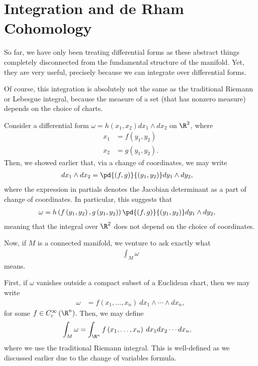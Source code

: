 \documentclass[10pt]{mypackage}
\begin{document}
\section{Integration and de Rham Cohomology}%
So far, we have only been treating differential forms as these abstract things completely disconnected from the fundamental structure of the manifold. Yet, they are very useful, precisely because we can integrate over differential forms.\newline

Of course, this integration is absolutely not the same as the traditional Riemann or Lebesgue integral, because the measure of a set (that has nonzero measure) depends on the choice of charts.\newline

Consider a differential form $\omega = h\left( x_1,x_2 \right)dx_1\wedge dx_2$ on $\R^{2}$, where
\begin{align*}
  x_1 &= f\left( y_1,y_2 \right)\\
  x_2 &= g\left( y_1,y_2 \right).
\end{align*}
Then, we showed earlier that, via a change of coordinates, we may write
\begin{align*}
  dx_1\wedge dx_2 &= \pd{\left( f,g \right)}{\left( y_1,y_2 \right)} dy_1\wedge dy_2,
\end{align*}
where the expression in partials denotes the Jacobian determinant as a part of change of coordinates. In particular, this suggests that
\begin{align*}
  \omega &= h\left( f\left( y_1,y_2 \right),g\left( y_1,y_2 \right) \right) \pd{\left( f,g \right)}{\left( y_1,y_2 \right)} dy_1\wedge dy_2,
\end{align*}
meaning that the integral over $\R^{2}$ does not depend on the choice of coordinates.\newline

Now, if $M$ is a connected manifold, we venture to ask exactly what
\begin{align*}
  \int_{M}^{} \omega
\end{align*}
means.\newline

First, if $\omega$ vanishes outside a compact subset of a Euclidean chart, then we may write
\begin{align*}
  \omega &= f\left( x_1,\dots,x_n \right)\:dx_1\wedge\cdots\wedge dx_n,
\end{align*}
for some $f\in C_{c}^{\infty}\left( \R^{n} \right)$. Then, we may define
\begin{align*}
  \int_{M}^{}\omega &= \int_{\R^{n}}^{} f\left( x_1,\dots,x_n \right)\:dx_1 dx_2\cdots dx_n,
\end{align*}
where we use the traditional Riemann integral. This is well-defined as we discussed earlier due to the change of variables formula.\newline
\end{document}
